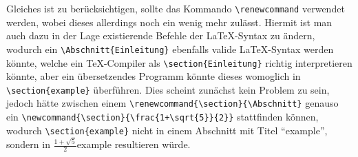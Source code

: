 \noindent
Gleiches ist zu berücksichtigen, sollte das Kommando \verb|\renewcommand| verwendet werden, wobei dieses allerdings noch ein wenig mehr zulässt. Hiermit ist man auch dazu in der Lage existierende Befehle der \LaTeX{}-Syntax zu ändern, wodurch ein \verb|\Abschnitt{Einleitung}| ebenfalls valide \LaTeX{}-Syntax werden könnte, welche ein \TeX{}-Compiler als \verb|\section{Einleitung}| richtig interpretieren könnte, aber ein übersetzendes Programm könnte dieses womoglich in \verb|\section{example}| überführen. Dies scheint zunächst kein Problem zu sein, jedoch hätte zwischen einem \verb|\renewcommand{\section}{\Abschnitt}| genauso ein \verb|\newcommand{\section}{\frac{1+\sqrt{5}}{2}}| stattfinden können, wodurch \verb|\section{example}| nicht in einem Abschnitt mit Titel \enquote{example}, sondern in $\frac{1+\sqrt{5}}{2}${example} resultieren würde.

